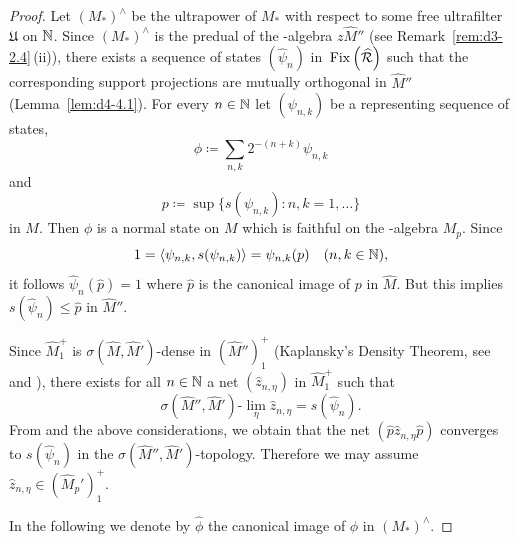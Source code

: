 \begin{proof}
Let $ (M_{*})^{\wedge} $  be the ultrapower of\/ $ M_{*} $  with respect to some free ultrafilter $ \mathfrak{U} $  on $ \mathbb{N} $.
Since $ (M_{*})^{\wedge} $  is the predual of the \WA-algebra $ z\widehat{M}'' $  
(see Remark~\ref{rem:d3-2.4}\,(ii)), there exists a sequence of states $ (\widehat{\psi}_{n}) $  in $ \mathop{}\mathrm{Fix}\left(\widehat{\mathcal{R}}\right) $  such that the corresponding support projections are mutually orthogonal in $ \widehat{M}'' $  (Lemma~\ref{lem:d4-4.1}).
For every $ n \in \mathbb{N} $  let $ (\psi_{n,k}) $  be a representing sequence of states, 
\[
\phi \coloneqq \sum_{n,k} 2^{-(n+k)} \psi_{n,k}
\]
and 
\[
p \coloneqq \sup\{s(\psi_{n,k}) \colon n,k=1,\ldots\}
\]
in $ M $.
Then $ \phi $  is a normal state on $ M $  which is faithful on the \WA-algebra $ M_{p} $.
Since 
\[
1 = \langle\psi_{n,k},s(\psi_{n,k})\rangle = \psi_{n,k}(p) \quad (n,k \in \mathbb{N}) ,
\]
it follows $ \widehat{\psi}_{n}(\widehat{p}) = 1 $  where $ \widehat{p} $  is the canonical image of\/ $ p $  in $ \widehat{M} $.
But this implies $ s(\widehat{\psi}_{n}) \leq \widehat{p} $  in $ \widehat{M}'' $.

Since $ \widehat{M}_{1}^{+} $  is $ \sigma(\widehat{M},\widehat{M}') $-dense in $ (\widehat{M}'')_{1}^{+} $  (Kaplansky's Density Theorem, see \textcite[1.9.1]{sakai:1971} and \textcite[1.8.9 and 1.8.12]{sakai:1971}), there exists for all $ n \in \mathbb{N} $  a net $ (\hat{z}_{n,\eta}) $  in $ \widehat{M}_{1}^{+} $  such that
\[
\sigma(\widehat{M}'',\widehat{M}')\text{-}\lim_{\eta} \hat{z}_{n,\eta} = s(\widehat{\psi}_{n}).
\]
From \textcite[1.7.8]{sakai:1971} and the above considerations, we obtain that the net $ (\widehat{p}\hat{z}_{n,\eta}\widehat{p}) $  converges to $ s(\widehat{\psi}_{n}) $  in the $ \sigma(\widehat{M}'',\widehat{M}') $-topology.
Therefore we may assume $ \hat{z}_{n,\eta} \in (\widehat{M}_{p}')_{1}^{+} $.

In the following we denote by $ \widehat{\phi} $  the canonical image of\/ $ \phi $  in $ (M_{*})^{\wedge} $.


\end{proof}
